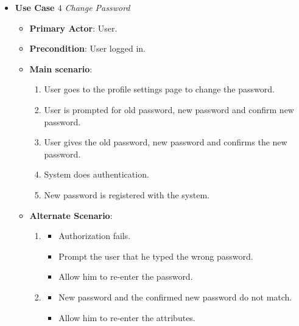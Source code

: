 \documentclass{report}
\begin{document}
\begin{tcolorbox}[colframe=white, colback=lightred, arc=8pt]
\begin{itemize}
    \item \textbf{Use Case $4$} \textit{Change Password
}\\
    \begin{itemize}
        \item \textbf{Primary Actor}: User.
        \item \textbf{Precondition}: User logged in.
        \item \textbf{Main scenario}: \begin{enumerate}
            \item User goes to the profile settings page to change the password. 
            \item User is prompted for old password, new password and confirm new password.
            \item User gives the old password, new password and confirms the new password.
            \item System does authentication.
            \item New password is registered with the system.
        \end{enumerate}
       \item \textbf{Alternate Scenario}: 
       \begin{enumerate}
           \item 
           \begin{itemize} 
           \item Authorization fails.
            \item Prompt the user that he typed the wrong password.
            \item Allow him to re-enter the password.
           \end{itemize}
           \item 
           \begin{itemize}
           \item New password and the confirmed new password do not match.
           \item Allow him to re-enter the attributes. 
           \end{itemize}
       \end{enumerate}
    \end{itemize}
\end{itemize}
\end{tcolorbox}
\end{document}
